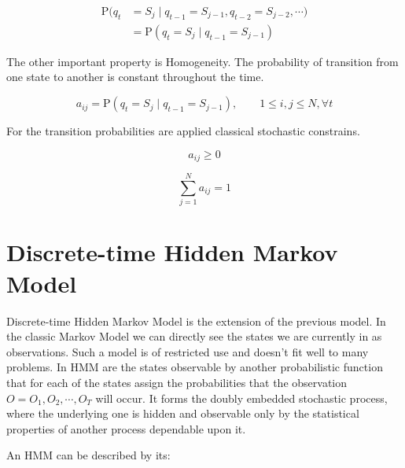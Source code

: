 \documentclass[thesis=M,english]{FITthesis}[2012/10/20]
\begin{document}
\begin{equation}\label{eq:mp}
\begin{aligned}
\mathrm{P}(q_t & = S_j \mid q_{t-1} = S_{j-1}, q_{t-2} = S_{j-2}, \cdots)  \\   
               & = \mathrm{P}(q_t = S_j \mid q_{t-1} = S_{j-1} )
\end{aligned}
\end{equation}

The other important property is Homogeneity. The probability of transition from one state to another is constant throughout the time. 

\begin{equation}\label{eq:homo}
   a_{ij} = \mathrm{P}(q_t = S_j \mid q_{t-1} = S_{j-1} ),\qquad 1 \leq i,j \leq N, \forall t
\end{equation}

For the transition probabilities are applied classical stochastic constrains.

\begin{equation}
   a_{ij} \geq 0
\end{equation}

\begin{equation}
   \sum_{j=1}^N a_{ij} = 1
\end{equation}

\section{Discrete-time Hidden Markov Model}

Discrete-time Hidden Markov Model is the extension of the previous model. In the classic Markov Model we can directly see the states we are currently in as observations. Such a model is of restricted use and doesn't fit well to many problems. In HMM are the states observable by another probabilistic function that for each of the states assign the probabilities that the observation $O = O_1,O_2,\cdots,O_T$ will occur. It forms the doubly embedded stochastic process, where the underlying one is hidden and observable only by the statistical properties of another process dependable upon it.

An HMM can be described by its:
\end{document}
